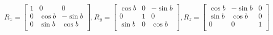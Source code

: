 \documentclass[12pt]{article}
\begin{document}
\[
    R_x = \begin{bmatrix}
		1 & 0 & 0 \\
        0 & \cos b & -\sin b \\
        0 & \sin b & \cos b \\
    \end{bmatrix}, 
    R_y = \begin{bmatrix}
        \cos b & 0 & -\sin b \\
		0 & 1 & 0 \\
        \sin b & 0 & \cos b \\
    \end{bmatrix}, 
    R_z = \begin{bmatrix}
        \cos b & -\sin b & 0 \\
        \sin b & \cos b & 0 \\
		0 & 0 & 1 \\
    \end{bmatrix} 
\]
\end{document}
